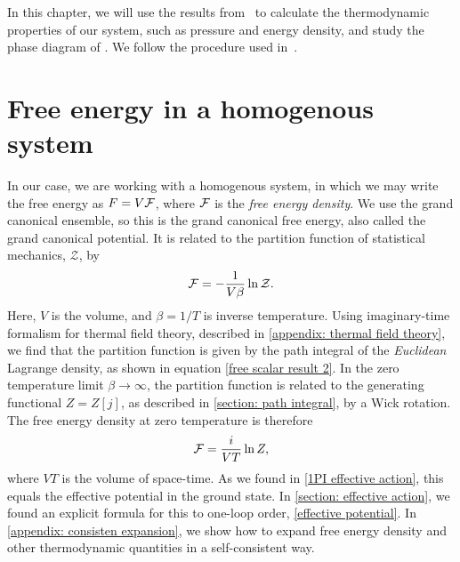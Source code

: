 In this chapter, we will use the results from \chpt\ to calculate the thermodynamic properties of our system, such as pressure and energy density, and study the phase diagram of \chpt.
We follow the procedure used in~\autocite{adhikariTwoflavorChiralPerturbation2019,martinariaTwoflavorChiralPerturbation2020}.

\section{Free energy in a homogenous system}
In our case, we are working with a homogenous system, in which we may write the free energy as $F = V\mathcal{F}$, where $\mathcal{F}$ is the \emph{free energy density}.
We use the grand canonical ensemble, so this is the grand canonical free energy, also called the grand canonical potential.
It is related to the partition function of statistical mechanics, $\mathcal{Z}$, by
%
\begin{equation}
    \mathcal{F} = - \frac{1}{V \beta} \ln \mathcal{Z}.
\end{equation}
%
Here, $V$ is the volume, and $\beta = 1/T$ is inverse temperature.
Using imaginary-time formalism for thermal field theory, described in \autoref{appendix: thermal field theory}, we find that the partition function is given by the path integral of the \emph{Euclidean} Lagrange density, as shown in equation \autoref{free scalar result 2}.
In the zero temperature limit  $\beta \rightarrow \infty$, the partition function is related to the generating functional $Z = Z[j]$, as described in \autoref{section: path integral}, by a Wick rotation.
The free energy density at zero temperature is therefore
%
\begin{equation}
    \mathcal{F} = \frac{i}{VT} \ln Z,
\end{equation}
%
where $VT$ is the volume of space-time.
As we found in \autoref{1PI effective action}, this equals the effective potential in the ground state.
In \autoref{section: effective action}, we found an explicit formula for this to one-loop order, \autoref{effective potential}.
In \autoref{appendix: consisten expansion}, we show how to expand free energy density and other thermodynamic quantities in a self-consistent way.

